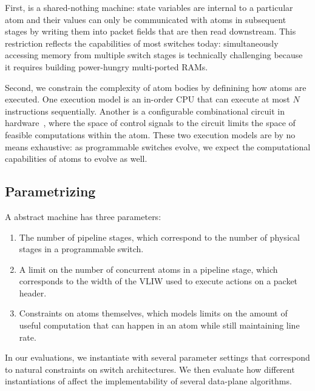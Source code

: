 First, \absmachine is a shared-nothing machine: state variables are internal to
a particular atom and their values can only be communicated with atoms in
subsequent stages by writing them into packet fields that are then read
downstream.  This restriction reflects the capabilities of most switches today:
simultaneously accessing memory from multiple switch stages is technically
challenging because it requires building power-hungry multi-ported RAMs.

Second, we constrain the complexity of atom bodies by definining how atoms are
executed. One execution model is an in-order CPU that can execute at most $N$
instructions sequentially. Another is a configurable combinational circuit in
hardware~\cite{dataflow}, where the space of control signals to the circuit
limits the space of feasible computations within the atom. These two execution
models are by no means exhaustive: as programmable switches evolve, we expect
the computational capabilities of atoms to evolve as well.

\subsection{Parametrizing \absmachine}

A \absmachine abstract machine has three parameters:
\begin{enumerate}
\item The number of pipeline stages, which correspond to the number of physical stages
  in a programmable switch.
\item A limit on the number of concurrent atoms in a pipeline stage, which corresponds
  to the width of the VLIW used to execute actions on a packet header.
\item Constraints on atoms themselves, which models limits on the amount of useful
  computation that can happen in an atom while still maintaining line rate.
\end{enumerate}
In our evaluations, we instantiate \absmachine with several parameter settings
that correspond to natural constraints on switch architectures. We then
evaluate how different instantiations of \absmachine affect the
implementability of several data-plane algorithms.

